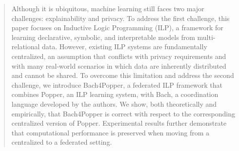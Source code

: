 \documentclass[runningheads]{llncs}
\begin{document}
\begin{sloppypar}
\begin{abstract}
%
%
Although it is ubiquitous, machine learning still faces two major challenges: explainability and privacy. To address the first challenge, this paper focuses on Inductive Logic Programming (ILP), a framework for learning declarative, symbolic, and interpretable models from multi-relational data. However, existing ILP systems are fundamentally centralized, an assumption that conflicts with privacy requirements and with many real-world scenarios in which data are inherently distributed and cannot be shared. To overcome this limitation and address the second challenge, we introduce Bach4Popper, a federated ILP framework that combines Popper, an ILP learning system, with Bach, a coordination language developed by the authors. We show, both theoretically and empirically, that Bach4Popper is correct with respect to the corresponding centralized version of Popper. Experimental results further demonstrate that computational performance is preserved when moving from a centralized to a federated setting.
% 
%
%
%
%

\end{abstract}
\end{sloppypar}
\end{document}
